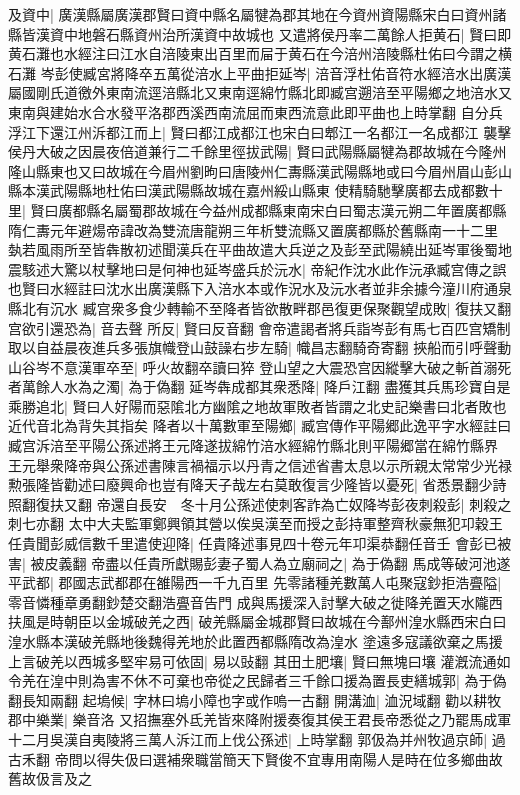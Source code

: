及資中|{
	廣漢縣屬廣漢郡賢曰資中縣名屬犍為郡其地在今資州資陽縣宋白曰資州諸縣皆漢資中地磐石縣資州治所漢資中故城也}
又遣將侯丹率二萬餘人拒黄石|{
	賢曰即黄石灘也水經注曰江水自涪陵東出百里而屇于黄石在今涪州涪陵縣杜佑曰今謂之横石灘}
岑彭使臧宮將降卒五萬從涪水上平曲拒延岑|{
	涪音浮杜佑音符水經涪水出廣漢屬國剛氏道徼外東南流逕涪縣北又東南逕綿竹縣北即臧宫遡涪至平陽鄉之地涪水又東南與建始水合水發平洛郡西溪西南流屈而東西流意此即平曲也上時掌翻}
自分兵浮江下還江州泝都江而上|{
	賢曰都江成都江也宋白曰郫江一名都江一名成都江}
襲擊侯丹大破之因晨夜倍道兼行二千餘里徑拔武陽|{
	賢曰武陽縣屬犍為郡故城在今隆州隆山縣東也又曰故城在今眉州劉昫曰唐陵州仁夀縣漢武陽縣地或曰今眉州眉山彭山縣本漢武陽縣地杜佑曰漢武陽縣故城在嘉州綏山縣東}
使精騎馳擊廣都去成都數十里|{
	賢曰廣都縣名屬蜀郡故城在今益州成都縣東南宋白曰蜀志漢元朔二年置廣都縣隋仁夀元年避煬帝諱改為雙流唐龍朔三年析雙流縣又置廣都縣於舊縣南一十二里}
埶若風雨所至皆犇散初述聞漢兵在平曲故遣大兵逆之及彭至武陽繞出延岑軍後蜀地震駭述大驚以杖擊地曰是何神也延岑盛兵於沅水|{
	帝紀作沈水此作沅承臧宫傳之誤也賢曰水經註曰沈水出廣漢縣下入涪水本或作況水及沅水者並非余據今潼川府通泉縣北有沉水}
臧宫衆多食少轉輸不至降者皆欲散畔郡邑復更保聚觀望成敗|{
	復扶又翻}
宫欲引還恐為|{
	音去聲}
所反|{
	賢曰反音翻}
會帝遣謁者將兵詣岑彭有馬七百匹宫矯制取以自益晨夜進兵多張旗幟登山鼓譟右步左騎|{
	幟昌志翻騎奇寄翻}
挾船而引呼聲動山谷岑不意漢軍卒至|{
	呼火故翻卒讀曰猝}
登山望之大震恐宫因縱擊大破之斬首溺死者萬餘人水為之濁|{
	為于偽翻}
延岑犇成都其衆悉降|{
	降戶江翻}
盡獲其兵馬珍寶自是乘勝追北|{
	賢曰人好陽而惡隂北方幽隂之地故軍敗者皆謂之北史記樂書曰北者敗也近代音北為背失其指矣}
降者以十萬數軍至陽鄉|{
	臧宫傳作平陽郷此逸平字水經註曰臧宫泝涪至平陽公孫述將王元降遂拔綿竹涪水經綿竹縣北則平陽郷當在綿竹縣界}
王元舉衆降帝與公孫述書陳言禍福示以丹青之信述省書太息以示所親太常常少光禄勲張隆皆勸述曰廢興命也豈有降天子哉左右莫敢復言少隆皆以憂死|{
	省悉景翻少詩照翻復扶又翻}
帝還自長安　冬十月公孫述使刺客詐為亡奴降岑彭夜刺殺彭|{
	刺殺之刺七亦翻}
太中大夫監軍鄭興領其營以俟吳漢至而授之彭持軍整齊秋豪無犯卭穀王任貴聞彭威信數千里遣使迎降|{
	任貴降述事見四十卷元年卭渠恭翻任音壬}
會彭已被害|{
	被皮義翻}
帝盡以任貴所獻賜彭妻子蜀人為立廟祠之|{
	為于偽翻}
馬成等破河池遂平武都|{
	郡國志武都郡在雒陽西一千九百里}
先零諸種羌數萬人屯聚寇鈔拒浩亹隘|{
	零音憐種章勇翻鈔楚交翻浩亹音告門}
成與馬援深入討擊大破之徙降羌置天水隴西扶風是時朝臣以金城破羌之西|{
	破羌縣屬金城郡賢曰故城在今鄯州湟水縣西宋白曰湟水縣本漢破羌縣地後魏得羌地於此置西都縣隋改為湟水}
塗遠多寇議欲棄之馬援上言破羌以西城多堅牢易可依固|{
	易以䜴翻}
其田土肥壤|{
	賢曰無塊曰壤}
灌漑流通如令羌在湟中則為害不休不可棄也帝從之民歸者三千餘口援為置長吏繕城郭|{
	為于偽翻長知兩翻}
起塢候|{
	字林曰塢小障也字或作嗚一古翻}
開溝洫|{
	洫況域翻}
勸以耕牧郡中樂業|{
	樂音洛}
又招撫塞外氐羌皆來降附援奏復其侯王君長帝悉從之乃罷馬成軍　十二月吳漢自夷陵將三萬人泝江而上伐公孫述|{
	上時掌翻}
郭伋為并州牧過京師|{
	過古禾翻}
帝問以得失伋曰選補衆職當簡天下賢俊不宜專用南陽人是時在位多鄉曲故舊故伋言及之

